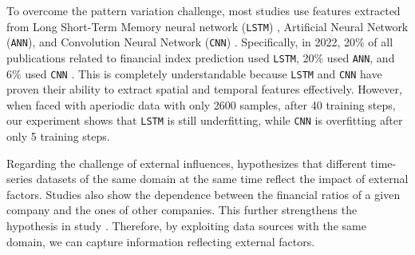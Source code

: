 \documentclass[aps,prb,groupedaddress,twocolumn,showpacs,dvipdfmx,superscriptaddress,pdftex]{revtex4-2}
\begin{document}
To overcome the pattern variation challenge, most studies use features extracted from Long Short-Term Memory neural network (\verb|LSTM|) \cite{hochreiter1997long}, Artificial Neural Network (\verb|ANN|), and Convolution Neural Network (\verb|CNN|) \cite{lecun1989handwritten}. Specifically, in 2022, 20\% of all publications related to financial index prediction used \verb|LSTM|, 20\% used \verb|ANN|, and 6\% used \verb|CNN| \cite{ayitey2023forex}. This is completely understandable because \verb|LSTM| and \verb|CNN| have proven their ability to extract spatial and temporal features effectively. However, when faced with aperiodic data with only 2600 samples, after 40 training steps, our experiment shows that \verb|LSTM| is still underfitting, while \verb|CNN| is overfitting after only 5 training steps.

\vspace{2mm}


Regarding the challenge of external influences, \cite{fama1970efficient} hypothesizes that different time-series datasets of the same domain at the same time reflect the impact of external factors. Studies \citep{overreactioncontrarian, mech1993portfolio} also show the dependence between the financial ratios of a given company and the ones of other companies. This further strengthens the hypothesis in study \cite{fama1970efficient}. Therefore, by exploiting data sources with the same domain, we can capture information reflecting external factors.

\vspace{2mm}

\end{document}
